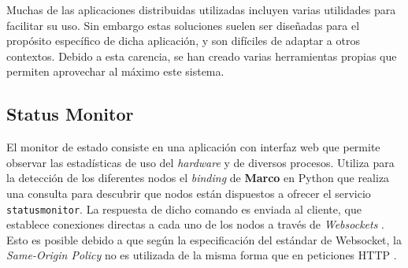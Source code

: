 Muchas de las aplicaciones distribuidas utilizadas incluyen varias utilidades para facilitar su uso. Sin embargo estas soluciones suelen ser diseñadas para el propósito específico de dicha aplicación, y son difíciles de adaptar a otros contextos. Debido a esta carencia, se han creado varias herramientas propias que permiten aprovechar al máximo este sistema.

\subsection{Status Monitor}

El monitor de estado consiste en una aplicación con interfaz web que permite observar las estadísticas de uso del \textit{hardware} y de diversos procesos. Utiliza para la detección de los diferentes nodos el \textit{binding} de \textbf{Marco} en Python que realiza una consulta para descubrir que nodos están dispuestos a ofrecer el servicio \texttt{statusmonitor}. La respuesta de dicho comando es enviada al cliente, que establece conexiones directas a cada uno de los nodos a través de \textit{Websockets} \cite{rfc6455}. Esto es posible debido a que según la especificación del estándar de Websocket, la \textit{Same-Origin Policy} no es utilizada de la misma forma que en peticiones HTTP \cite{rfc6454}.


